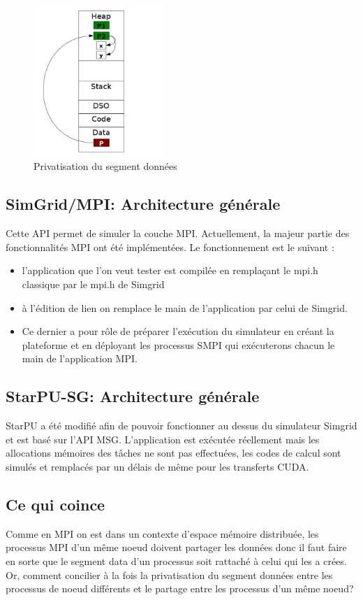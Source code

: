 \documentclass[smallextended]{svjour3}
\begin{document}
\begin{figure}[htb]
\centering
\includegraphics[width=5cm]{./Img/Memoire.jpg}
\caption{\label{fig:1}Privatisation du segment données}
\end{figure}

\subsection{SimGrid/MPI: Architecture générale}
\label{sec-3-2}
Cette API permet de simuler la couche MPI. Actuellement, la majeur
partie des fonctionnalités MPI ont été implémentées. 
Le fonctionnement est le suivant :
\begin{itemize}
\item l'application que l'on veut tester est compilée en remplaçant
le mpi.h classique par le mpi.h de Simgrid
\item à l'édition de lien on remplace le main de l'application par
celui de Simgrid.
\item Ce dernier a pour rôle de préparer l'exécution du simulateur
en créant la plateforme et en déployant les processus SMPI qui
exécuterons chacun le main de l'application MPI.
\end{itemize}

\subsection{StarPU-SG: Architecture générale}
\label{sec-3-3}
StarPU a été modifié afin de pouvoir fonctionner au dessus du
simulateur Simgrid et est basé sur l'API MSG. L'application est
exécutée réellement mais les allocations mémoires des tâches ne
sont pas effectuées, les codes de calcul sont simulés et remplacés
par un délais de même pour les transferts CUDA.

\subsection{Ce qui coince}
\label{sec-3-4}
Comme en MPI on est dans un contexte d'espace mémoire distribuée,
les processus MPI d'un même noeud doivent partager les données donc
il faut faire en sorte que le segment data d'un processus soit
rattaché à celui qui les a crées. Or, comment concilier à la fois
la privatisation du segment données entre les processus de noeud
différents et le partage entre les processus d'un même noeud?
\end{document}

